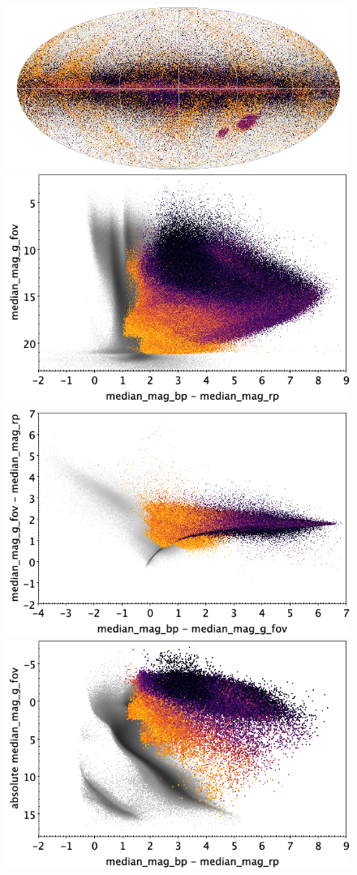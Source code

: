 \documentclass[longauth]{aa}
\begin{document}
\begin{appendix}
\begin{figure}
\centering
{}
\includegraphics[width=0.6\hsize]{figures/appendix/LPV_cls_sky.png} 
 \\ %
\vspace{4mm}
 \includegraphics[width=0.45\hsize]{figures/appendix/LPV_cls_cm.png}  %
\hspace{2mm}
 \includegraphics[width=0.45\hsize]{figures/appendix/LPV_cls_cc.png} \\ %
\vspace{4mm}
 \includegraphics[width=0.45\hsize]{figures/appendix/LPV_cls_cam.png}  %

\end{figure}
\end{appendix}
\end{document}
